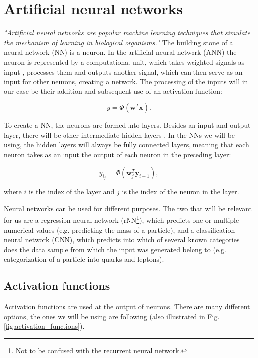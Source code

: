 \documentclass{ctuthesis}
\begin{document}
\section{Artificial neural networks}
\emph{"Artificial neural networks are popular machine learning techniques that simulate the mechanism of learning in biological organisms."} \cite[p.2]{data_augmentation} The building stone of a neural network (NN) is a neuron. In the artificial neural network (ANN) the neuron is represented by a computational unit, which takes weighted signals as input \cite[p.3]{data_augmentation}, processes them and outputs another signal, which can then serve as an input for other neurons, creating a network. The processing of the inputs will in our case be their addition and subsequent use of an activation function:

\begin{equation}
    y = \Phi(\mathbf{w}^T \mathbf{x}).
\end{equation}

To create a NN, the neurons are formed into layers. Besides an input and output layer, there will be other intermediate hidden layers \cite[p.5]{data_augmentation}. In the NNs we will be using, the hidden layers will always be fully connected layers, meaning that each neuron takes as an input the output of each neuron in the preceding layer:

\begin{equation}
    y_{i_j} = \Phi(\mathbf{w}_j^T \mathbf{y}_{i-1}),
\end{equation}

where $i$ is the index of the layer and $j$ is the index of the neuron in the layer.

Neural networks can be used for different purposes. The two that will be relevant for us are a regression neural network (rNN\footnote{Not to be confused with the recurrent neural network.}), which predicts one or multiple numerical values (e.g. predicting the mass of a particle), and a classification neural network (CNN), which predicts into which of several known categories does the data sample from which the input was generated belong to (e.g. categorization of a particle into quarks and leptons).

\subsection{Activation functions}
Activation functions are used at the output of neurons. There are many different options, the ones we will be using are following (also illustrated in Fig. \ref{fig:activation_functions}).
\end{document}
